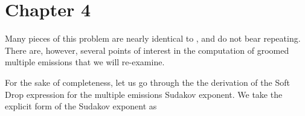 \section*{Chapter 4}


\iffalse
Many pieces of this problem are nearly identical to , and do not bear repeating.
%
There are, however, several points of interest in the computation of groomed multiple emissions that we will re-examine.


For the sake of completeness, let us go through the the derivation of the Soft Drop expression for the multiple emissions Sudakov exponent. We take the explicit form of the Sudakov exponent as


